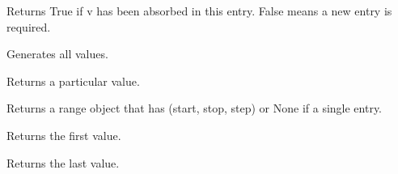 \documentclass[letterpaper,10pt,english]{sphinxmanual}
\begin{document}
\begin{fulllineitems}

\begin{fulllineitems}
\label{\detokenize{ref/LIS/core/Rle:TotalDepth.LIS.core.Rle.RLEItem.add}}
Returns True if v has been absorbed in this entry. False means a
new entry is required.

\end{fulllineitems}


\begin{fulllineitems}
\label{\detokenize{ref/LIS/core/Rle:TotalDepth.LIS.core.Rle.RLEItem.values}}
Generates all values.

\end{fulllineitems}


\begin{fulllineitems}
\label{\detokenize{ref/LIS/core/Rle:TotalDepth.LIS.core.Rle.RLEItem.value}}
Returns a particular value.

\end{fulllineitems}


\begin{fulllineitems}
\label{\detokenize{ref/LIS/core/Rle:TotalDepth.LIS.core.Rle.RLEItem.range}}
Returns a range object that has (start, stop, step) or None if a single entry.

\end{fulllineitems}


\begin{fulllineitems}
\label{\detokenize{ref/LIS/core/Rle:TotalDepth.LIS.core.Rle.RLEItem.first}}
Returns the first value.

\end{fulllineitems}


\begin{fulllineitems}
\label{\detokenize{ref/LIS/core/Rle:TotalDepth.LIS.core.Rle.RLEItem.last}}
Returns the last value.


\end{fulllineitems}
\end{fulllineitems}
\end{document}
